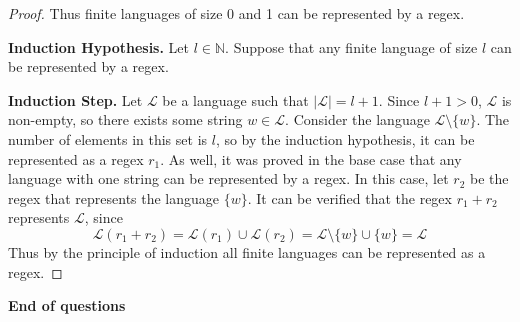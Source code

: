 \documentclass[11pt]{article}
\begin{document}
\begin{enumerate}[label=\textbf{Q\arabic*.}]
\begin{proof}
	Thus finite languages of size 0 and 1 can be represented by a regex.

	\textbf{Induction Hypothesis.} Let \(l \in \mathbb{N}\). Suppose that any finite language of size \(l\) can be represented by a regex.

	\textbf{Induction Step.} Let \(\mathcal{L}\) be a language such that \(|\mathcal{L}| = l + 1\). Since \(l+1 > 0\), \(\mathcal{L}\) is non-empty, so there exists some string \(w \in \mathcal{L}\). Consider the language \(\mathcal{L} \setminus \{w\}\). The number of elements in this set is \(l\), so by the induction hypothesis, it can be represented as a regex \(r_1\). As well, it was proved in the base case that any language with one string can be represented by a regex. In this case, let \(r_2\) be the regex that represents the language \(\{w\}\). It can be verified that the regex \(r_1 + r_2\) represents \(\mathcal{L}\), since
	\[
		\mathcal{L} (r_1 + r_2) = \mathcal{L} (r_1) \cup \mathcal{L} (r_2) = \mathcal{L} \setminus \{w\} \cup \{w\} = \mathcal{L}
	\]
	Thus by the principle of induction all finite languages can be represented as a regex.

\end{proof}


	\end{enumerate}

\vspace{1cm}

 \textbf{End of questions}
\end{document}
